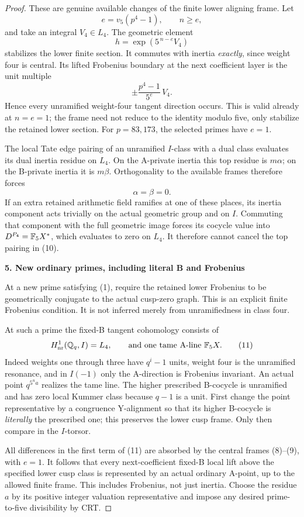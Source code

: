 \begin{proof}
These are genuine available changes of the finite lower aligning frame. Let
\[
 e=v_5(p^4-1),\qquad n\ge e,
\]
and take an integral $V_4\in L_4$. The geometric element
\[
 h=\exp(5^{\,n-e}V_4)
 \tag{8}
\]
stabilizes the lower finite section. It commutes with inertia \emph{exactly}, since weight four is central. Its lifted Frobenius boundary at the next coefficient layer is the unit multiple
\[
 \pm\frac{p^4-1}{5^e}\,V_4.
 \tag{9}
\]
Hence every unramified weight-four tangent direction occurs. This is valid already at $n=e=1$; the frame need not reduce to the identity modulo five, only stabilize the retained lower section. For $p=83,173$, the selected primes have $e=1$.

The local Tate edge pairing of an unramified $I$-class with a dual class evaluates its dual inertia residue on $L_4$. On the A-private inertia this top residue is $m\alpha$; on the B-private inertia it is $m\beta$. Orthogonality to the available frames therefore forces
\[
 \alpha=\beta=0.
 \tag{10}
\]
If an extra retained arithmetic field ramifies at one of these places, its inertia component acts trivially on the actual geometric group and on $I$. Commuting that component with the full geometric image forces its cocycle value into $D^{P_4}=\mathbb F_5X^*$, which evaluates to zero on $L_4$. It therefore cannot cancel the top pairing in (10).

\par\medskip\noindent\textbf{5. New ordinary primes, including literal B and Frobenius}\par\nobreak\smallskip
At a new prime satisfying (1), require the retained lower Frobenius to be geometrically conjugate to the actual cusp-zero graph. This is an explicit finite Frobenius condition. It is not inferred merely from unramifiedness in class four.

At such a prime the fixed-B tangent cohomology consists of
\[
 H^1_{\mathrm{nr}}(\mathbb Q_q,I)=L_4,
 \qquad\text{and one tame A-line }\mathbb F_5X.
 \tag{11}
\]
Indeed weights one through three have $q^i-1$ units, weight four is the unramified resonance, and in $I(-1)$ only the A-direction is Frobenius invariant. An actual point $q^{5^n a}$ realizes the tame line. The higher prescribed B-cocycle is unramified and has zero local Kummer class because $q-1$ is a unit. First change the point representative by a congruence Y-alignment so that its higher B-cocycle is \emph{literally} the prescribed one; this preserves the lower cusp frame. Only then compare in the $I$-torsor.

All differences in the first term of (11) are absorbed by the central frames (8)--(9), with $e=1$. It follows that every next-coefficient fixed-B local lift above the specified lower cusp class is represented by an actual ordinary A-point, up to the allowed finite frame. This includes Frobenius, not just inertia. Choose the residue $a$ by its positive integer valuation representative and impose any desired prime-to-five divisibility by CRT.


\end{proof}
